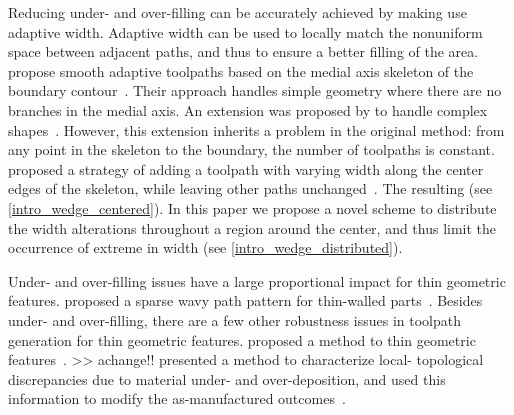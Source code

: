 Reducing under- and over-filling can be accurately achieved by making use  adaptive  width.
Adaptive width can be used to locally match the nonuniform space between adjacent paths, and thus to ensure a better filling of the area.
\citeauthor{kao1998optimal} propose smooth adaptive toolpaths based on the medial axis skeleton of the boundary contour~\cite{kao1998optimal}.
Their approach handles simple geometry where there are no branches in the medial axis.
An extension was proposed by \citeauthor{Ding2016a} to handle complex shapes~\cite{Ding2016a}.
However, this extension inherits a problem in the original method:
from any point in the skeleton to the boundary, the number of toolpaths is constant.
\citeauthor{Jin2017JMS} proposed a strategy of adding a toolpath with varying width along the center edges of the skeleton, while leaving other paths unchanged~\cite{Jin2017JMS}.
The resulting  (see \cref{intro_wedge_centered}).
In this paper we propose a novel scheme to distribute the width alterations throughout a region around the center, and thus limit the occurrence of extreme  in width (see \cref{intro_wedge_distributed}).

Under- and over-filling issues have a large proportional impact for thin geometric features.
\citeauthor{Jin2017a} proposed a sparse wavy path pattern for thin-walled parts~\cite{Jin2017a}.
Besides under- and over-filling, there are a few other robustness issues in toolpath generation for thin geometric features.
\citeauthor{Moesen2011} proposed a method to  thin geometric features~\cite{Moesen2011}.
>> achange!!
\citeauthor{Behandish2019a} presented a method to characterize local- topological discrepancies due to material under- and over-deposition, and used this information to modify the as-manufactured outcomes~\cite{Behandish2019a}. 


